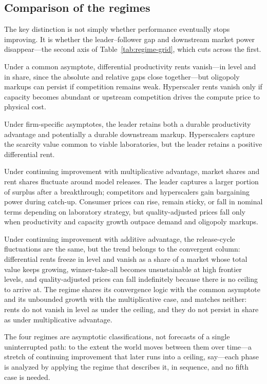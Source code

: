 \documentclass[11pt]{article}
\begin{document}
\subsection{Comparison of the regimes}
\label{subsec:regime-comparison}

The key distinction is not simply whether performance eventually stops improving. It is whether the leader--follower gap and downstream market power disappear---the second axis of Table~\ref{tab:regime-grid}, which cuts across the first.

Under a common asymptote, differential productivity rents vanish---in level and in share, since the absolute and relative gaps close together---but oligopoly markups can persist if competition remains weak. Hyperscaler rents vanish only if capacity becomes abundant or upstream competition drives the compute price to physical cost.

Under firm-specific asymptotes, the leader retains both a durable productivity advantage and potentially a durable downstream markup. Hyperscalers capture the scarcity value common to viable laboratories, but the leader retains a positive differential rent.

Under continuing improvement with multiplicative advantage, market shares and rent shares fluctuate around model releases. The leader captures a larger portion of surplus after a breakthrough; competitors and hyperscalers gain bargaining power during catch-up. Consumer prices can rise, remain sticky, or fall in nominal terms depending on laboratory strategy, but quality-adjusted prices fall only when productivity and capacity growth outpace demand and oligopoly markups.

Under continuing improvement with additive advantage, the release-cycle fluctuations are the same, but the trend belongs to the convergent column: differential rents freeze in level and vanish as a share of a market whose total value keeps growing, winner-take-all becomes unsustainable at high frontier levels, and quality-adjusted prices can fall indefinitely because there is no ceiling to arrive at. The regime shares its convergence logic with the common asymptote and its unbounded growth with the multiplicative case, and matches neither: rents do not vanish in level as under the ceiling, and they do not persist in share as under multiplicative advantage.

The four regimes are asymptotic classifications, not forecasts of a single uninterrupted path: to the extent the world moves between them over time---a stretch of continuing improvement that later runs into a ceiling, say---each phase is analyzed by applying the regime that describes it, in sequence, and no fifth case is needed.
\end{document}
